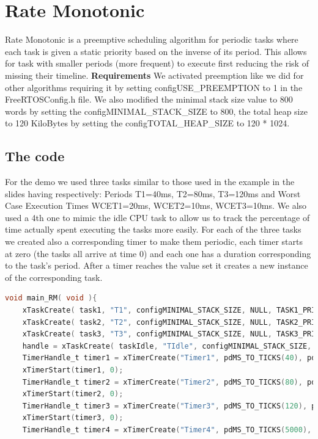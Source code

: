 \documentclass[9pt, reqno]{amsart}
\theoremstyle{definition}
\theoremstyle{remark}
\numberwithin{equation}{section}
\begin{document}
{\section{Rate Monotonic}
Rate Monotonic is a preemptive scheduling algorithm for periodic tasks where each task is given a static priority based on the inverse of its period. This allows for task with smaller periods (more frequent) to execute first reducing the risk of missing their timeline.
\textbf{Requirements}\newline
We activated preemption like we did for other algorithms requiring it by setting configUSE\_PREEMPTION to 1 in the FreeRTOSConfig.h file. We also modified the minimal stack size value to 800 words by setting the configMINIMAL\_STACK\_SIZE to 800,  the total heap size to 120 KiloBytes by setting the configTOTAL\_HEAP\_SIZE to 120 * 1024.
\subsection{The code}
For the demo we used three tasks similar to those used in the example in the slides having respectively: Periods T1=40ms, T2=80ms, T3=120ms and Worst Case Execution Times WCET1=20ms, WCET2=10ms, WCET3=10ms. We also used a 4th one to mimic the idle CPU task to allow us to track the percentage of time actually spent executing the tasks more easily.
For each of the three tasks we created also a corresponding timer to make them periodic, each timer starts at zero (the tasks all arrive at time 0) and each one has a duration corresponding to the task’s period. After a timer reaches the value set it creates a new instance of the corresponding task. 
\begin{lstlisting}[breaklines=true, basicstyle=\bfseries,language=c,basicstyle=\small]
void main_RM( void ){
    xTaskCreate( task1, "T1", configMINIMAL_STACK_SIZE, NULL, TASK1_PRIORITY, NULL );  
    xTaskCreate( task2, "T2", configMINIMAL_STACK_SIZE, NULL, TASK2_PRIORITY, NULL );   
    xTaskCreate( task3, "T3", configMINIMAL_STACK_SIZE, NULL, TASK3_PRIORITY, NULL );  
    handle = xTaskCreate( taskIdle, "TIdle", configMINIMAL_STACK_SIZE, NULL, tskIDLE_PRIORITY, NULL );  
    TimerHandle_t timer1 = xTimerCreate("Timer1", pdMS_TO_TICKS(40), pdTRUE, NULL, timer1func);
    xTimerStart(timer1, 0);
    TimerHandle_t timer2 = xTimerCreate("Timer2", pdMS_TO_TICKS(80), pdTRUE, NULL, timer2func);
    xTimerStart(timer2, 0);
    TimerHandle_t timer3 = xTimerCreate("Timer3", pdMS_TO_TICKS(120), pdTRUE, NULL, timer3func);
    xTimerStart(timer3, 0);
    TimerHandle_t timer4 = xTimerCreate("Timer4", pdMS_TO_TICKS(5000), pdTRUE, NULL, timer4func);

\end{lstlisting}}
\end{document}
